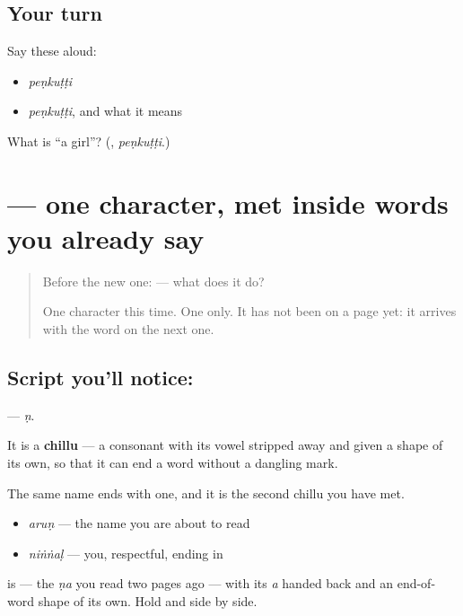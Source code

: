 \subsection*{Your turn}
Say these aloud:

\begin{itemize}
\raggedright
  \item \emph{peṇkuṭṭi}
  \item \emph{peṇkuṭṭi}, and what it means
\end{itemize}

\begin{tcolorbox}[breakable,colback=teal!4,colframe=teal!35!black,title={Before you move on}]
What is \textquotedblleft{}a girl\textquotedblright{}? (\textbf{}, \emph{peṇkuṭṭi}.)
\end{tcolorbox}
\section[\texorpdfstring{\ml{ൺ} (ṇ)}{ൺ (ṇ)}]{ — one character, met inside words you already say}

\label{lesson:ML-S131-chillu-nn}



\begin{quote}
Before the new one:  — what does it do?

One character this time. One only. It has not been on a page yet: it arrives with the word on the next one.
\end{quote}

\subsection*{Script you'll notice: }
\textbf{} — \emph{ṇ}.

It is a \textbf{chillu} — a consonant with its vowel stripped away and given a shape of its own, so that it can end a word without a dangling mark.

The same name ends with one, and it is the second chillu you have met.

\begin{itemize}
\raggedright
  \item \textbf{} \emph{aruṇ} — the name you are about to read
  \item \textbf{} \emph{niṅṅaḷ} — you, respectful, ending in \textbf{}
\end{itemize}

\textbf{} is \textbf{} — the \emph{ṇa} you read two pages ago — with its \emph{a} handed back and an end-of-word shape of its own. Hold \textbf{} and \textbf{} side by side.

